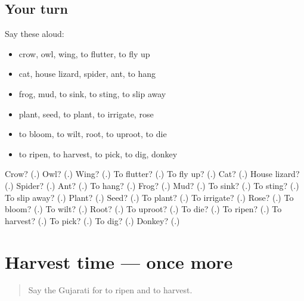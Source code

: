 \subsection*{Your turn}
Say these aloud:

\begin{itemize}
\raggedright
  \item crow, owl, wing, to flutter, to fly up
  \item cat, house lizard, spider, ant, to hang
  \item frog, mud, to sink, to sting, to slip away
  \item plant, seed, to plant, to irrigate, rose
  \item to bloom, to wilt, root, to uproot, to die
  \item to ripen, to harvest, to pick, to dig, donkey
\end{itemize}

\begin{tcolorbox}[breakable,colback=teal!4,colframe=teal!35!black,title={Before you move on}]
Crow? (\textbf{}.) Owl? (\textbf{}.) Wing? (\textbf{}.) To flutter? (\textbf{}.) To fly up? (\textbf{}.) Cat? (\textbf{}.) House lizard? (\textbf{}.) Spider? (\textbf{}.) Ant? (\textbf{}.) To hang? (\textbf{}.) Frog? (\textbf{}.) Mud? (\textbf{}.) To sink? (\textbf{}.) To sting? (\textbf{}.) To slip away? (\textbf{}.) Plant? (\textbf{}.) Seed? (\textbf{}.) To plant? (\textbf{}.) To irrigate? (\textbf{}.) Rose? (\textbf{}.) To bloom? (\textbf{}.) To wilt? (\textbf{}.) Root? (\textbf{}.) To uproot? (\textbf{}.) To die? (\textbf{}.) To ripen? (\textbf{}.) To harvest? (\textbf{}.) To pick? (\textbf{}.) To dig? (\textbf{}.) Donkey? (\textbf{}.)
\end{tcolorbox}
\section[(dialogue)]{Harvest time — once more}

\label{lesson:GU-R242-review-final-242}



\begin{quote}
Say the Gujarati for to ripen and to harvest.
\end{quote}

